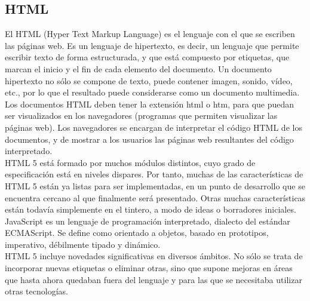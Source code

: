 \documentclass[12pt]{book}
\begin{document}
\subsection{HTML}
El HTML (Hyper Text Markup Language) es el lenguaje con el que se escriben las páginas web. Es un lenguaje de hipertexto, es decir, un lenguaje que permite escribir texto de forma estructurada, y que está compuesto por etiquetas, que marcan el inicio y el fin de cada elemento del documento. Un documento hipertexto no sólo se compone de texto, puede contener imagen, sonido, vídeo, etc., por lo que el resultado puede considerarse como un documento multimedia. Los documentos HTML deben tener la extensión html o htm, para que puedan ser visualizados en los navegadores (programas que permiten visualizar las páginas web). Los navegadores se encargan de interpretar el código HTML de los documentos, y de mostrar a los usuarios las páginas web resultantes del código interpretado. \\
HTML 5 está formado por muchos módulos distintos, cuyo grado de especificación está en niveles dispares. Por tanto, muchas de las características de HTML 5 están ya listas para ser implementadas, en un punto de desarrollo que se encuentra cercano al que finalmente será presentado. Otras muchas características están todavía simplemente en el tintero, a modo de ideas o borradores iniciales. JavaScript es un lenguaje de programación interpretado, dialecto del estándar ECMAScript. Se define como orientado a objetos, basado en prototipos, imperativo, débilmente tipado y dinámico. \\
HTML 5 incluye novedades significativas en diversos ámbitos. No sólo se trata de incorporar nuevas etiquetas o eliminar otras, sino que supone mejoras en áreas que hasta ahora quedaban fuera del lenguaje y para las que se necesitaba utilizar otras tecnologías.  
\end{document}
